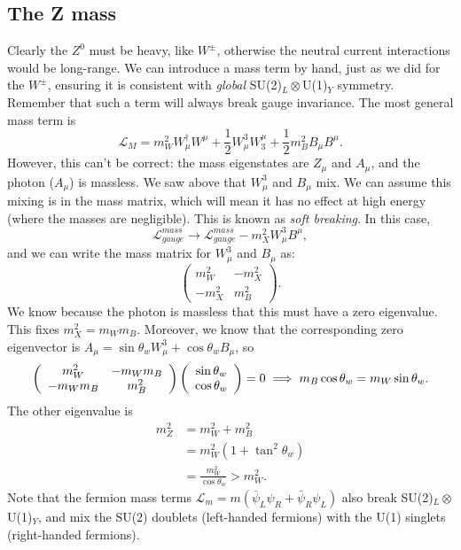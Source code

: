 \subsection{The Z mass}
%
Clearly the $Z^0$ must be heavy, like $W^\pm$, otherwise the neutral current interactions would be long-range. We can introduce a mass term by hand, just as we did for the $W^\pm$, ensuring it is consistent with \textit{global} SU(2)$_L \otimes$U(1)$_Y$ symmetry. Remember that such a term will always break gauge invariance. The most general mass term is
\begin{equation}
\mathcal{L}_M  = m_W^2 W_\mu^\dagger W^\mu + \frac{1}{2} W_\mu^3 W_3^\mu + \frac{1}{2}m_B^2 B_\mu B^\mu.
\end{equation}
However, this can't be correct: the mass eigenstates are $Z_\mu$ and $A_\mu$, and the photon ($A_\mu$) is massless. We saw above that $W_\mu^3$ and $B_\mu$ mix. We can assume this mixing is in the mass matrix, which will mean it has no effect at high energy (where the masses are negligible). This is known as \textit{soft breaking}. In this case,
\begin{equation}
\mathcal{L}_{gauge}^{mass} \to \mathcal{L}_{gauge}^{mass} - m_X^2W_\mu^3 B^\mu,
\end{equation}
and we can write the mass matrix for $W_\mu^3$ and $B_\mu$ as:
\[ \left( \begin{array}{cc}
m_W^2 & -m_X^2  \\
-m_X^2 & m_B^2  \end{array} \right).  \]
We know because the photon is massless that this must have a zero eigenvalue. This fixes $m_X^2 = m_W m_B$. Moreover, we know that the corresponding zero eigenvector is
$A_\mu = \sin\theta_w W_\mu^3 + \cos\theta_w B_\mu$, so 
\[ \left( \begin{array}{cc}
m_W^2 & -m_Wm_B  \\
-m_Wm_B & m_B^2  \end{array} \right)
\left( \begin{array}{cc}
\sin\theta_w \\
\cos\theta_w \end{array} \right) = 0 \\
\implies m_B\cos\theta_w = m_W\sin\theta_w. \]
The other eigenvalue is 
\begin{equation}
\begin{split}
m_Z^2 &= m_W^2 + m_B^2 \\
&= m_W^2(1+ \tan^2\theta_w) \\
&= \frac{m_W^2}{\cos\theta_w} > m_W^2.
\end{split}
\end{equation}
Note that the fermion mass terms $\mathcal{L}_m = m(\bar{\psi}_L\psi_R + \bar{\psi}_R \psi_L)$ also break SU(2)$_L \otimes$U(1)$_Y$, and mix the SU(2) doublets (left-handed fermions) with the U(1) singlets (right-handed fermions). 
%
